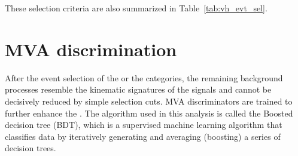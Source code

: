 These selection criteria are also summarized in Table~\ref{tab:vh_evt_sel}.
\begin{table}[!htb]
    \centering
    \captionsetup{justification=centering}
    \label{tab:vh_evt_sel}
\end{table}



\section{MVA discrimination}\label{sec:vh_bdt_cats}

After the event selection of the \WH or the \ZH categories, the remaining background processes 
resemble the kinematic signatures of the signals and cannot be decisively reduced by simple selection cuts.
MVA discriminators are trained to further enhance the \SoB.
The algorithm used in this analysis is called the Boosted decision tree (BDT),
which is a supervised machine learning algorithm that classifies data by 
iteratively generating and averaging (boosting) a series of decision trees.

